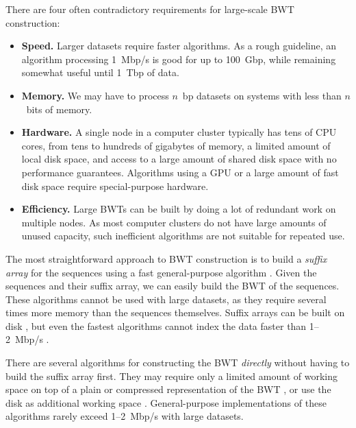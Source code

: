 \documentclass[smallabstract,smallcaptions]{dccpaper}
\newcommand{\BWT}{\textsf{BWT}}
\begin{document}
There are four often contradictory requirements for large-scale \BWT{} construction:
\begin{itemize}

\item \textbf{Speed.} Larger datasets require faster algorithms. As a rough guideline, an algorithm processing 1~Mbp/s is good for up to 100~Gbp, while remaining somewhat useful until 1~Tbp of data.

\item \textbf{Memory.} We may have to process $n$~bp datasets on systems with less than $n$~bits of memory.

\item \textbf{Hardware.} A single node in a computer cluster typically has tens of CPU cores, from tens to hundreds of gigabytes of memory, a limited amount of local disk space, and access to a large amount of shared disk space with no performance guarantees. Algorithms using a GPU or a large amount of fast disk space require special-purpose hardware.

\item \textbf{Efficiency.} Large \BWT{}s can be built by doing a lot of redundant work on multiple nodes. As most computer clusters do not have large amounts of unused capacity, such inefficient algorithms are not suitable for repeated use.

\end{itemize}

The most straightforward approach to \BWT{} construction is to build a \emph{suffix array} for the sequences using a fast general-purpose algorithm \cite{Mori2008,Nong2011}. Given the sequences and their suffix array, we can easily build the \BWT{} of the sequences. These algorithms cannot be used with large datasets, as they require several times more memory than the sequences themselves. Suffix arrays can be built on disk \cite{Gonnet1992}, but even the fastest algorithms cannot index the data faster than 1\nobreakdash--2~Mbp/s \cite{Bingmann2013,Kaerkkaeinen2014a,Nong2014,Kaerkkaeinen2015a}.

There are several algorithms for constructing the \BWT{} \emph{directly} without having to build the suffix array first. They may require only a limited amount of working space on top of a plain or compressed representation of the \BWT{} \cite{Hon2007,Kaerkkaeinen2007,Siren2009,Okanohara2009}, or use the disk as additional working space \cite{Ferragina2012,Beller2013}. General-purpose implementations of these algorithms rarely exceed 1\nobreakdash--2~Mbp/s with large datasets.
\end{document}
